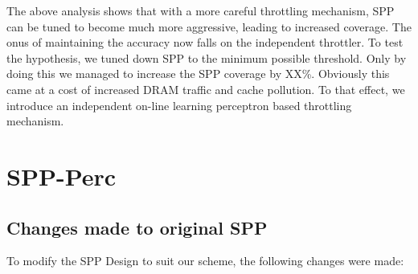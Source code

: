 \documentclass{sig-alternate}
\begin{document}
The above analysis shows that with a more careful throttling mechanism, SPP can be tuned to become much more aggressive, leading to increased coverage. The onus of maintaining the accuracy now falls on the independent throttler. To test the hypothesis, we tuned down SPP to the minimum possible threshold. Only by doing this we managed to increase the SPP coverage by XX\%. Obviously this came at a cost of increased DRAM traffic and cache pollution. To that effect, we introduce an independent on-line learning perceptron based throttling mechanism.

\section{SPP-Perc}

\subsection{Changes made to original SPP}
To modify the SPP Design to suit our scheme, the following changes were made:
\end{document}
